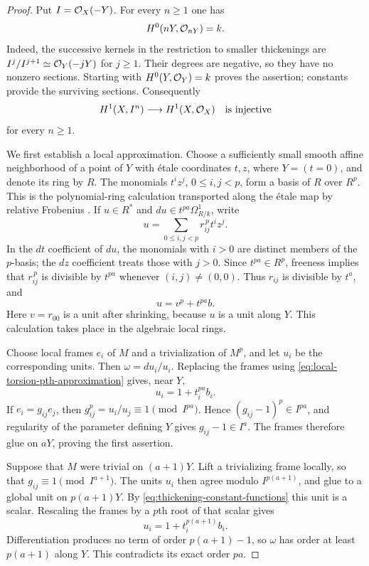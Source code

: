 \begin{proof}
Put $I=\mathcal O_X(-Y)$. For every $n\geq1$ one has
\begin{equation}\label{eq:thickening-constant-functions}
 H^0(nY,\mathcal O_{nY})=k.
\end{equation}
Indeed, the successive kernels in the restriction to smaller
thickenings are
$I^j/I^{j+1}\simeq\mathcal O_Y(-jY)$ for $j\geq1$.
Their degrees are negative, so they have no nonzero sections.
Starting with $H^0(Y,\mathcal O_Y)=k$ proves the assertion; constants
provide the surviving sections. Consequently
\begin{equation}\label{eq:thickening-cohomology-injection}
 H^1(X,I^n)\longrightarrow H^1(X,\mathcal O_X)
 \quad\text{is injective}
\end{equation}
for every $n\geq1$.

We first establish a local approximation. Choose a sufficiently
small smooth affine neighborhood of a point of $Y$ with
\'etale coordinates $t,z$, where $Y=(t=0)$, and denote its ring
by $R$. The monomials $t^iz^j$, $0\leq i,j<p$, form a basis of
$R$ over $R^p$. This is the polynomial-ring calculation transported
along the \'etale map by relative Frobenius
\cite[Tag~0EBS]{Stacks}. If $u\in R^*$ and
$du\in t^{pa}\Omega^1_{R/k}$, write
\[
 u=\sum_{0\leq i,j<p}r_{ij}^{\,p}t^iz^j.
\]
In the $dt$ coefficient of $du$, the monomials with $i>0$ are
distinct members of the $p$-basis; the $dz$ coefficient treats
those with $j>0$. Since $t^{pa}\in R^p$, freeness implies that
$r_{ij}^{\,p}$ is divisible by $t^{pa}$ whenever $(i,j)\ne(0,0)$.
Thus $r_{ij}$ is divisible by $t^a$, and
\begin{equation}\label{eq:local-torsion-pth-approximation}
 u=v^p+t^{pa}b.
\end{equation}
Here $v=r_{00}$ is a unit after shrinking, because $u$ is a unit
along $Y$. This calculation takes place in the algebraic local
rings.

Choose local frames $e_i$ of $M$ and a trivialization of $M^p$,
and let $u_i$ be the corresponding units. Then
$\omega=du_i/u_i$. Replacing the frames using
\eqref{eq:local-torsion-pth-approximation} gives, near $Y$,
\[
 u_i=1+t_i^{pa}b_i.
\]
If $e_i=g_{ij}e_j$, then
$g_{ij}^p=u_i/u_j\equiv1\pmod{I^{pa}}$.
Hence $(g_{ij}-1)^p\in I^{pa}$, and regularity of the parameter
defining $Y$ gives $g_{ij}-1\in I^a$.
The frames therefore glue on $aY$, proving the first assertion.

Suppose that $M$ were trivial on $(a+1)Y$. Lift a trivializing
frame locally, so that $g_{ij}\equiv1\pmod{I^{a+1}}$.
The units $u_i$ then agree modulo $I^{p(a+1)}$, and glue to a
global unit on $p(a+1)Y$. By
\eqref{eq:thickening-constant-functions} this unit is a scalar.
Rescaling the frames by a $p$th root of that scalar gives
\[
 u_i=1+t_i^{p(a+1)}b_i.
\]
Differentiation produces no term of order $p(a+1)-1$, so
$\omega$ has order at least $p(a+1)$ along $Y$. This contradicts
its exact order $pa$.
\end{proof}

